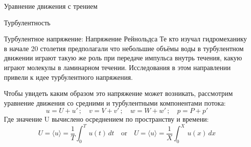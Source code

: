\begin{chapter}{Уравнение движения с трением}
\begin{section}{Турбулентность}
\begin{paragraph}{Турбулентное напряжение: Напряжение Рейнольдса}
Те кто изучал гидромеханику в начале 20 столетия предполагали что
небольшие объёмы воды в турбулентном движении играют такую же роль при
передаче импульса внутрь течения, какую играют молекулы в ламинарном
течении. Исследования в этом направлении привели к идее турбулентного
напряжения.
%

Чтобы увидеть каким образом это напряжение может возникать, рассмотрим
уравнение движения со средними и турбулентными компонентами потока:
\begin{equation}
u=U+u' \,;\quad v = V+v' \,;\quad w=W+w' \, ;\quad p=P+p'
\end{equation}
Где значение U вычислено осреднением по пространству и времени:
\begin{equation}
U = \langle u \rangle =\frac{1}{T}\int^T_0\,u(t)\,dt \quad \text{or}\quad
U = \langle u \rangle =\frac{1}{X}\int^X_0\,u(x)\,dx
\end{equation}
%


\end{paragraph}
\end{section}
\end{chapter}
